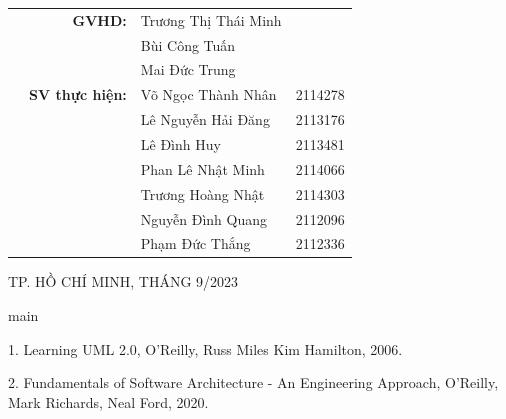 \documentclass[a4paper]{article}
\begin{document}
\begin{titlepage}
\begin{table}[h]
\begin{tabular}{rrll}
\hspace{4cm} & \textbf{GVHD:} & Trương Thị Thái Minh \\
& &Bùi Công Tuấn \\
& &Mai Đức Trung
\\
& \textbf{SV thực hiện:} & Võ Ngọc Thành Nhân & 2114278 \\
& & Lê Nguyễn Hải Đăng & 2113176 \\
& & Lê Đình Huy & 2113481 \\
& & Phan Lê Nhật Minh & 2114066 \\
& & Trương Hoàng Nhật & 2114303 \\
& & Nguyễn Đình Quang & 2112096 \\
& & Phạm Đức Thắng & 2112336 \\
\end{tabular}
\end{table}

\begin{center}
{\footnotesize TP. HỒ CHÍ MINH, THÁNG 9/2023}
\end{center}
\end{titlepage}

\thispagestyle{empty}

\newpage
\tableofcontents
\newpage


{main}
	

 \newpage
\begin{thebibliography}{80}

1. Learning UML 2.0, O’Reilly, Russ Miles Kim Hamilton, 2006.\newline


2. Fundamentals of Software Architecture - An Engineering Approach, O’Reilly, Mark
Richards, Neal Ford, 2020.
 
{\refname}
 \end{thebibliography}
\end{document}

